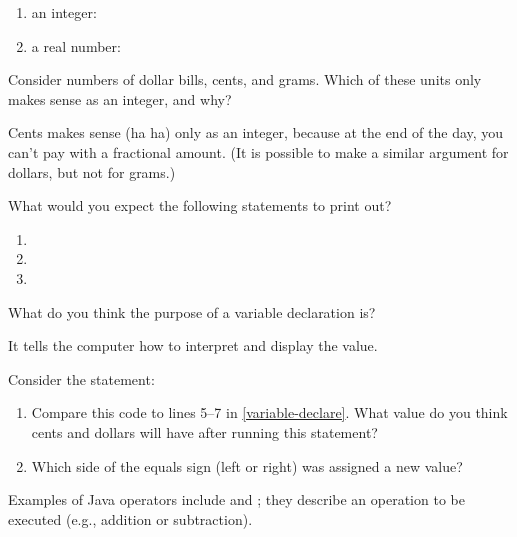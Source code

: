 \begin{enumerate}
\item an integer: 
\item a real number: 
\end{enumerate}


\Q Consider numbers of dollar bills, cents, and grams.
Which of these units only makes sense as an integer, and why?

\begin{answer}
Cents makes sense (ha ha) only as an integer, because at the end of the day, you can't pay with a fractional amount. (It is possible to make a similar argument for dollars, but not for grams.)
\end{answer}


\Q What would you expect the following statements to print out?

\begin{enumerate}
\item {} 
\item {} 
\item {} 
\end{enumerate}


\Q What do you think the purpose of a variable declaration is?

\begin{answer}
It tells the computer how to interpret and display the value.
\end{answer}


\Q Consider the statement: ~ 

\begin{enumerate}

\item Compare this code to lines 5--7 in \ref{variable-declare}.
What value do you think cents and dollars will have after running this statement?


\item Which side of the equals sign (left or right) was assigned a new value?

\end{enumerate}


\Q Examples of Java operators include \java{+} and \java{-}; they describe an operation to be executed (e.g., addition or subtraction).

